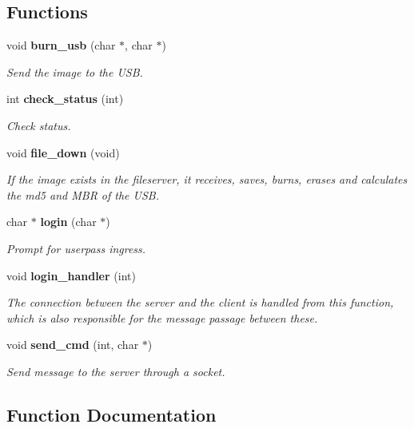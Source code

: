 \subsection*{Functions}
\begin{DoxyCompactItemize}
\item 
void \textbf{ burn\+\_\+usb} (char $\ast$, char $\ast$)
\begin{DoxyCompactList}\small\item\em Send the image to the U\+SB. \end{DoxyCompactList}\item 
int \textbf{ check\+\_\+status} (int)
\begin{DoxyCompactList}\small\item\em Check status. \end{DoxyCompactList}\item 
void \textbf{ file\+\_\+down} (void)
\begin{DoxyCompactList}\small\item\em If the image exists in the fileserver, it receives, saves, burns, erases and calculates the md5 and M\+BR of the U\+SB. \end{DoxyCompactList}\item 
char $\ast$ \textbf{ login} (char $\ast$)
\begin{DoxyCompactList}\small\item\em Prompt for userpass ingress. \end{DoxyCompactList}\item 
void \textbf{ login\+\_\+handler} (int)
\begin{DoxyCompactList}\small\item\em The connection between the server and the client is handled from this function, which is also responsible for the message passage between these. \end{DoxyCompactList}\item 
void \textbf{ send\+\_\+cmd} (int, char $\ast$)
\begin{DoxyCompactList}\small\item\em Send message to the server through a socket. \end{DoxyCompactList}\end{DoxyCompactItemize}


\subsection{Function Documentation}
\mbox{\label{client_8h_a8f5170bbb9c0c247151775f99a577ff5}} 
